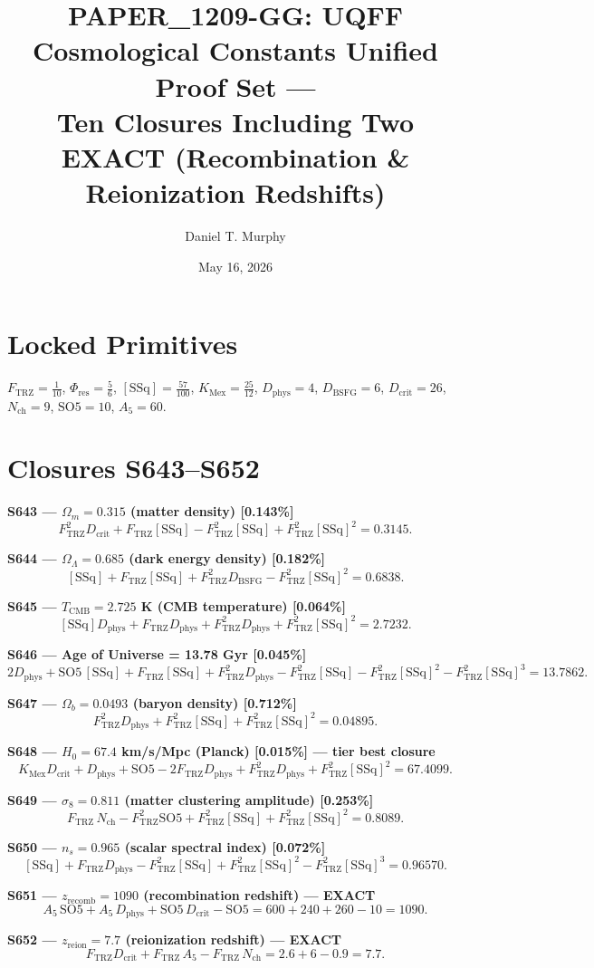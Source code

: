 \documentclass[11pt]{article}
\title{PAPER\_1209-GG: UQFF Cosmological Constants Unified Proof Set ---\\
Ten Closures Including Two EXACT (Recombination \& Reionization Redshifts)}
\author{Daniel T. Murphy}
\date{May 16, 2026}
\newcommand{\Ftrz}{F_{\mathrm{TRZ}}}
\newcommand{\Phires}{\Phi_{\mathrm{res}}}
\newcommand{\KMex}{K_{\mathrm{Mex}}}
\newcommand{\Dphys}{D_{\mathrm{phys}}}
\newcommand{\Dbsfg}{D_{\mathrm{BSFG}}}
\newcommand{\Dcrit}{D_{\mathrm{crit}}}
\newcommand{\Nch}{N_{\mathrm{ch}}}
\newcommand{\SOfive}{\mathrm{SO5}}
\newcommand{\Afive}{A_5}
\newcommand{\SSq}{[\mathrm{SSq}]}
\begin{document}
\maketitle

\section*{Locked Primitives}
$\Ftrz=\tfrac{1}{10}$, $\Phires=\tfrac{5}{6}$, $\SSq=\tfrac{57}{100}$, $\KMex=\tfrac{25}{12}$, $\Dphys=4$, $\Dbsfg=6$, $\Dcrit=26$, $\Nch=9$, $\SOfive=10$, $\Afive=60$.

\section*{Closures S643--S652}

\textbf{S643 --- $\Omega_m=0.315$ (matter density) [0.143\%]}
\[\Ftrz^2\Dcrit + \Ftrz\SSq - \Ftrz^2\SSq + \Ftrz^2\SSq^2 = 0.3145.\]

\textbf{S644 --- $\Omega_\Lambda=0.685$ (dark energy density) [0.182\%]}
\[\SSq + \Ftrz\SSq + \Ftrz^2\Dbsfg - \Ftrz^2\SSq^2 = 0.6838.\]

\textbf{S645 --- $T_{\mathrm{CMB}}=2.725$ K (CMB temperature) [0.064\%]}
\[\SSq\Dphys + \Ftrz\Dphys + \Ftrz^2\Dphys + \Ftrz^2\SSq^2 = 2.7232.\]

\textbf{S646 --- Age of Universe = 13.78 Gyr [0.045\%]}
\[2\Dphys + \SOfive\,\SSq + \Ftrz\SSq + \Ftrz^2\Dphys - \Ftrz^2\SSq - \Ftrz^2\SSq^2 - \Ftrz^2\SSq^3 = 13.7862.\]

\textbf{S647 --- $\Omega_b=0.0493$ (baryon density) [0.712\%]}
\[\Ftrz^2\Dphys + \Ftrz^2\SSq + \Ftrz^2\SSq^2 = 0.04895.\]

\textbf{S648 --- $H_0=67.4$ km/s/Mpc (Planck) [0.015\%] --- tier best closure}
\[\KMex\Dcrit + \Dphys + \SOfive - 2\Ftrz\Dphys + \Ftrz^2\Dphys + \Ftrz^2\SSq^2 = 67.4099.\]

\textbf{S649 --- $\sigma_8 = 0.811$ (matter clustering amplitude) [0.253\%]}
\[\Ftrz\,\Nch - \Ftrz^2\SOfive + \Ftrz^2\SSq + \Ftrz^2\SSq^2 = 0.8089.\]

\textbf{S650 --- $n_s = 0.965$ (scalar spectral index) [0.072\%]}
\[\SSq + \Ftrz\Dphys - \Ftrz^2\SSq + \Ftrz^2\SSq^2 - \Ftrz^2\SSq^3 = 0.96570.\]

\textbf{S651 --- $z_{\mathrm{recomb}} = 1090$ (recombination redshift) --- EXACT}
\[\Afive\,\SOfive + \Afive\,\Dphys + \SOfive\,\Dcrit - \SOfive = 600 + 240 + 260 - 10 = 1090.\]

\textbf{S652 --- $z_{\mathrm{reion}} = 7.7$ (reionization redshift) --- EXACT}
\[\Ftrz\Dcrit + \Ftrz\,\Afive - \Ftrz\,\Nch = 2.6 + 6 - 0.9 = 7.7.\]
\end{document}
